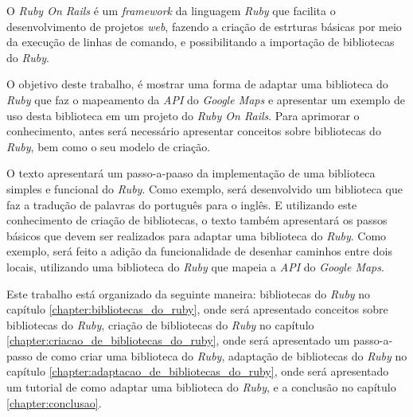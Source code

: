 O \emph{Ruby On Rails} é um \emph{framework} da linguagem \emph{Ruby} que facilita o
desenvolvimento de projetos \emph{web}, fazendo a criação de estrturas básicas por meio da
execução de linhas de comando, e possibilitando a importação de bibliotecas do \emph{Ruby}.

O objetivo deste trabalho, é mostrar uma forma de adaptar uma biblioteca do \emph{Ruby}
que faz o mapeamento da \emph{API} do \emph{Google Maps} e apresentar um exemplo de uso desta
biblioteca em um projeto do \emph{Ruby On Rails}. Para aprimorar o conhecimento, antes será
necessário apresentar conceitos sobre bibliotecas do \emph{Ruby}, bem como o seu modelo de
criação.

O texto apresentará um passo-a-paaso da implementação de uma biblioteca simples
e funcional do \emph{Ruby}. Como exemplo, será desenvolvido um biblioteca que faz a
tradução de palavras do português para o inglês. E utilizando este conhecimento de criação
de bibliotecas, o texto também apresentará os passos básicos que devem ser realizados
para adaptar uma biblioteca do \emph{Ruby}. Como exemplo, será feito a adição da
funcionalidade de desenhar caminhos entre dois locais, utilizando uma biblioteca do
\emph{Ruby} que mapeia a \emph{API} do \emph{Google Maps}. 

Este trabalho está organizado da seguinte maneira: bibliotecas do \emph{Ruby} no
capítulo \ref{chapter:bibliotecas_do_ruby}, onde será apresentado conceitos sobre
bibliotecas do \emph{Ruby}, criação de bibliotecas do \emph{Ruby} no capítulo 
\ref{chapter:criacao_de_bibliotecas_do_ruby}, onde será apresentado um passo-a-passo
de como criar uma biblioteca do \emph{Ruby}, adaptação de bibliotecas do \emph{Ruby}
no capítulo  \ref{chapter:adaptacao_de_bibliotecas_do_ruby}, onde será apresentado um
tutorial de como adaptar uma biblioteca do \emph{Ruby}, e a conclusão no capítulo
\ref{chapter:conclusao}.